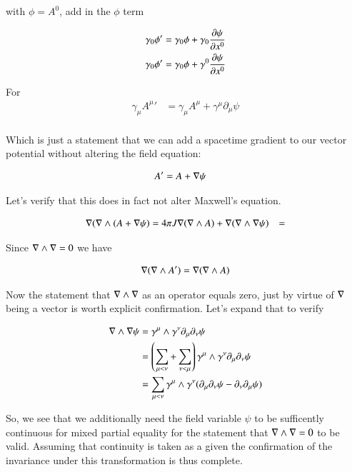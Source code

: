 \documentclass{article}
\begin{document}
with $\phi = A^0$, add in the $\phi$ term

\begin{align*}
\gamma_0 \phi' &= \gamma_0 \phi + \gamma_0 \frac{\partial {\psi}}{\partial {x^0}} \\
\gamma_0 \phi' &= \gamma_0 \phi + \gamma^0 \frac{\partial {\psi}}{\partial {x^0}}
\end{align*}

For
\begin{align*}
\gamma_\mu {A^\mu}' &= \gamma_\mu A^\mu + \gamma^\mu \partial_\mu \psi \\
\end{align*}

Which is just a statement that we can add a spacetime gradient to our vector potential without altering the field equation:

\begin{align*}
A' &= A + \nabla \psi
\end{align*}

Let's verify that this does in fact not alter Maxwell's equation.

\begin{align*}
\nabla (\nabla \wedge (A + \nabla \psi) &= 4 \pi J
\nabla (\nabla \wedge A) + \nabla (\nabla \wedge \nabla \psi) &= 
\end{align*}

Since $\nabla \wedge \nabla = 0$ we have

\begin{align*}
\nabla (\nabla \wedge A') = \nabla (\nabla \wedge A)
\end{align*}

Now the statement that $\nabla \wedge \nabla$ as an operator equals zero, just by virtue of $\nabla$ being a vector is worth explicit
confirmation.  Let's expand that to verify

\begin{align*}
\nabla \wedge \nabla \psi 
&= \gamma^\mu \wedge \gamma^\nu \partial_\mu \partial_\nu \psi \\
&= \left(\sum_{\mu < \nu} + \sum_{\nu < \mu}\right) \gamma^\mu \wedge \gamma^\nu \partial_\mu \partial_\nu \psi \\
&= \sum_{\mu < \nu} \gamma^\mu \wedge \gamma^\nu (\partial_\mu \partial_\nu \psi - \partial_\nu \partial_\mu \psi) \\
\end{align*}

So, we see that we additionally need the field variable $\psi$ to be sufficently continuous for mixed partial equality for the
statement that $\nabla \wedge \nabla = 0$ to be valid.  Assuming that continuity is taken as a given the confirmation of the invariance under this transformation is thus complete.
\end{document}
